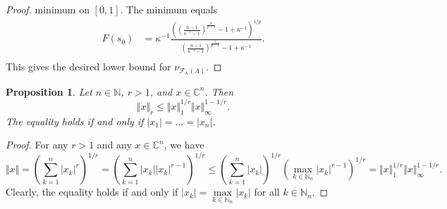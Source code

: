 \documentclass[12pt]{article}
\newtheorem{proposition}[theorem]{Proposition}
\begin{document}
\begin{proof}
    minimum on $[0,1]$. The minimum equals
    \[
    \begin{aligned}
        F(s_0)
        &=\kappa^{-1}
            \frac{
                \left(
                    \left(\frac{n-1}{\kappa^{-1}-1}
                    \right)^{\frac{p}{p-1}}
                    -1+\kappa^{-1}
                \right)^{1/p}
            }{
                \left(\frac{n-1}{\kappa^{-1}-1}
                \right)^{\frac{1}{p-1}}
                -1+\kappa^{-1}
            }. \\
    \end{aligned}
    \]
    This gives the desired lower bound 
    for $\nu_{\mathcal{F}_{\kappa}(\Lambda)}$.
\end{proof}

\begin{proposition}\label{SpclLyapIneq}
    Let $n\in\mathbb{N}$, $r>1$, and $x\in\mathbb{C}^n$. Then
    \[
        \Vert x\Vert_r\leq \Vert x\Vert_1^{1/r}\Vert x\Vert_\infty^{1-1/r}.
    \]
    The equality holds if and only if $|x_1|=\ldots=|x_n|$.
\end{proposition}
\begin{proof}
    For any $r>1$ and any $x\in\mathbb{C}^n$, we have
    \[
        \Vert x\Vert
        =\left(\sum_{k=1}^n |x_k|^r \right)^{1/r}
        =\left(\sum_{k=1}^n |x_k| |x_k|^{r-1} \right)^{1/r}
        \leq\left(\sum_{k=1}^n |x_k| \right)^{1/r} 
        \left(\max\limits_{k\in\mathbb{N}_n}|x_k|^{r-1}\right)^{1/r}
        =\Vert x\Vert_1^{1/r}\Vert x\Vert_\infty^{1-1/r}.
    \]
    Clearly, the equality holds if and only if $|x_k|=\max\limits_{k\in\mathbb{N}_n}|x_k|$
    for all $k\in\mathbb{N}_n$.
\end{proof}
\end{document}
